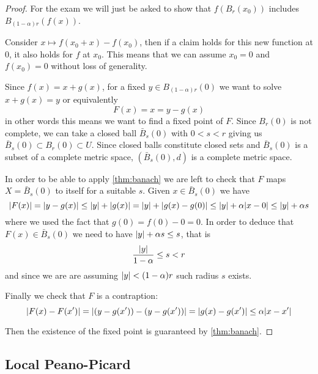 \documentclass[12pt]{extarticle}
\numberwithin{equation}{section}
\begin{document}
\begin{proof}
	For the exam we will just be asked to show that $f(B_r(x_0))$ includes $B_{(1-\alpha)r}(f(x))$.

	Consider $x \mapsto f(x_0 + x) - f(x_0)$, then if a claim holds for this new function at $0$, it also holds for $f$ at $x_0$.
	This means that we can assume $x_0 = 0$ and $f(x_0) =0$ without loss of generality.

	Since $f(x) = x + g(x)$, for a fixed $y \in B_{(1-\alpha)r}(0)$ we want to solve $x + g(x) = y$ or equivalently
	\begin{equation}
		F(x) = x = y-g(x)
	\end{equation}
	in other words this means we want to find a fixed point of $F$.
	Since $B_r(0)$ is not complete, we can take a closed ball $\bar B_s(0)$ with $0 < s< r$ giving us
	$\bar B_s(0) \subset B_r(0) \subset U$.
	Since closed balls constitute closed sets and $\bar B_s(0)$ is a subset of a complete metric space,
	$(\bar B_s(0), d)$ is a complete metric space.

	In order to be able to apply \cref{thm:banach} we are left to check that $F$ maps $X = \bar B_s(0)$ to itself
	for a suitable $s$.
	Given $x \in \bar B_s(0)$ we have
	\begin{equation}
		\abs{F(x)} = \abs{y - g(x)} \leq \abs{y} + \abs{g(x)} =  \abs{y} + \abs{g(x) - g(0)} \leq \abs{y} + \alpha \abs{x - 0} \leq \abs{y} + \alpha s
	\end{equation}
	where we used the fact that $g(0) = f(0) - 0 = 0$.
	In order to deduce that $F(x) \in \bar B_s (0)$ we need to have $\abs{y} + \alpha s \leq s$, that is
	\begin{equation}
		\frac{\abs{y}}{1-\alpha} \leq s < r
	\end{equation}
	and since we are are assuming $\abs{y} < (1-\alpha) r$ such radius $s$ exists.

	Finally we check that $F$ is a contraption:
	\begin{equation}
		\abs{F(x) - F(x')} = \abs{(y-g(x')) - (y-g(x'))} = \abs{g(x)-g(x')} \leq \alpha \abs{x-x'}
	\end{equation}

	Then the existence of the fixed point is guaranteed by \cref{thm:banach}.
\end{proof}

\subsection{Local Peano-Picard}
\end{document}
